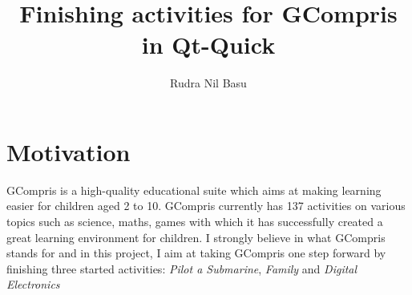 \documentclass[preprint,12pt]{elsarticle}
\begin{document}
\begin{frontmatter}



\title{Finishing activities for GCompris in Qt-Quick}


\author{Rudra Nil Basu}

\address{ \textbf{Email ID}: rudra.nil.basu.1996@gmail.com}
\address{ \textbf{Freenode IRC Nick}: rudra}
\address{ \textbf{Location}: Kolkata, West Bengal, India UTC+5.30}

\end{frontmatter}


\section{Motivation}
\label{S:1}


GCompris is a high-quality educational suite which aims at making learning easier for children aged 2 to 10. GCompris currently has 137 activities on various topics such as science, maths, games with which it has successfully created a great learning environment for children. I strongly believe in what GCompris stands for and in this project, I aim at taking GCompris one step forward by finishing three started activities: \textit{Pilot a Submarine}, \textit{Family} and \textit{Digital Electronics}
\end{document}
